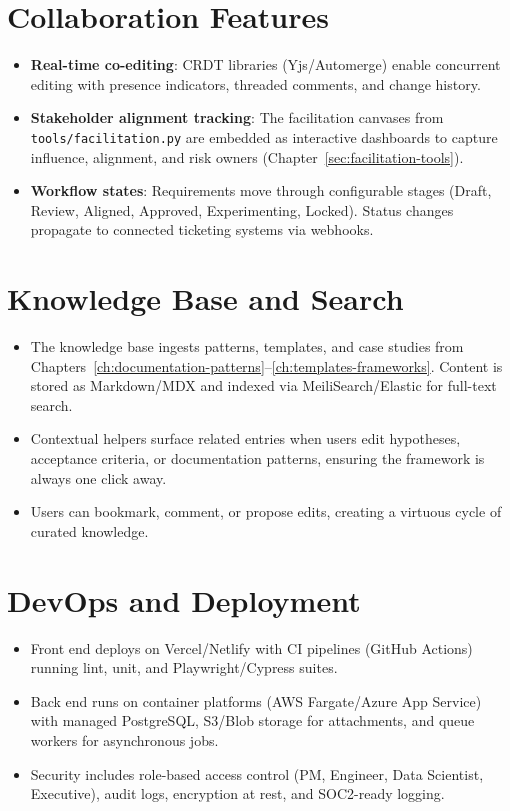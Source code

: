 \section{Collaboration Features}
\begin{itemize}
    \item \textbf{Real-time co-editing}: CRDT libraries (Yjs/Automerge) enable concurrent editing with presence indicators, threaded comments, and change history.
    \item \textbf{Stakeholder alignment tracking}: The facilitation canvases from \texttt{tools/facilitation.py} are embedded as interactive dashboards to capture influence, alignment, and risk owners (Chapter~\ref{sec:facilitation-tools}).
    \item \textbf{Workflow states}: Requirements move through configurable stages (Draft, Review, Aligned, Approved, Experimenting, Locked). Status changes propagate to connected ticketing systems via webhooks.
\end{itemize}

\section{Knowledge Base and Search}
\begin{itemize}
    \item The knowledge base ingests patterns, templates, and case studies from Chapters~\ref{ch:documentation-patterns}--\ref{ch:templates-frameworks}. Content is stored as Markdown/MDX and indexed via MeiliSearch/Elastic for full-text search.
    \item Contextual helpers surface related entries when users edit hypotheses, acceptance criteria, or documentation patterns, ensuring the framework is always one click away.
    \item Users can bookmark, comment, or propose edits, creating a virtuous cycle of curated knowledge.
\end{itemize}

\section{DevOps and Deployment}
\begin{itemize}
    \item Front end deploys on Vercel/Netlify with CI pipelines (GitHub Actions) running lint, unit, and Playwright/Cypress suites.
    \item Back end runs on container platforms (AWS Fargate/Azure App Service) with managed PostgreSQL, S3/Blob storage for attachments, and queue workers for asynchronous jobs.
    \item Security includes role-based access control (PM, Engineer, Data Scientist, Executive), audit logs, encryption at rest, and SOC2-ready logging.
\end{itemize}


